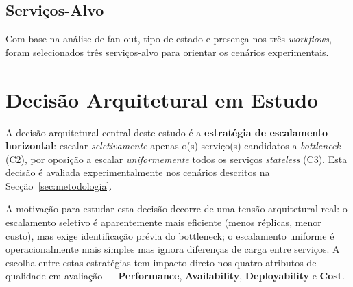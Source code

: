\documentclass[acmsmall,screen=true,nonacm]{acmart}
\begin{document}
\subsection{Serviços-Alvo}

Com base na análise de fan-out, tipo de estado e presença nos três \textit{workflows}, foram selecionados três serviços-alvo para orientar os cenários experimentais.

\begin{table}[h]
\caption{Serviços-alvo selecionados (ST1--ST3), tipo, cenário de escala e justificação.}
\label{tab:alvos}
\end{table}

\section{Decisão Arquitetural em Estudo}

A decisão arquitetural central deste estudo é a \textbf{estratégia de escalamento horizontal}: escalar \emph{seletivamente} apenas o(s) serviço(s) candidatos a \textit{bottleneck} (C2), por oposição a escalar \emph{uniformemente} todos os serviços \textit{stateless} (C3). Esta decisão é avaliada experimentalmente nos cenários descritos na Secção~\ref{sec:metodologia}.

A motivação para estudar esta decisão decorre de uma tensão arquitetural real: o escalamento seletivo é aparentemente mais eficiente (menos réplicas, menor custo), mas exige identificação prévia do bottleneck; o escalamento uniforme é operacionalmente mais simples mas ignora diferenças de carga entre serviços. A escolha entre estas estratégias tem impacto direto nos quatro atributos de qualidade em avaliação — \textbf{Performance}, \textbf{Availability}, \textbf{Deployability} e \textbf{Cost}.
\end{document}
